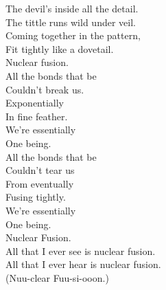 The devil's inside all the detail. \\
The tittle runs wild under veil. \\
Coming together in the pattern, \\
Fit tightly like a dovetail. \\

Nuclear fusion. \\

All the bonds that be \\
Couldn't break us. \\
Exponentially \\
In fine feather. \\
We're essentially \\
One being. \\

All the bonds that be \\
Couldn't tear us \\
From eventually \\
Fusing tightly. \\
We're essentially \\
One being. \\
Nuclear Fusion. \\

All that I ever see is nuclear fusion. \\
All that I ever hear is nuclear fusion. \\

(Nuu-clear Fuu-si-ooon.) \\




